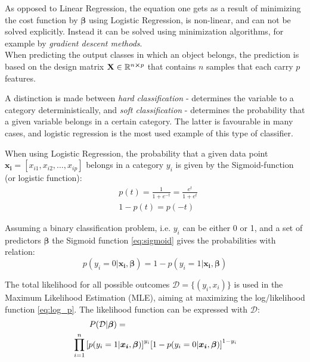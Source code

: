 As opposed to Linear Regression, the equation one gets as a result of minimizing the cost function by $\boldsymbol{\beta}$ using Logistic Regression, is non-linear, and can not be solved explicitly. Instead it can be solved using minimization algorithms, for example by \emph{gradient descent methods}. \\

When predicting the output classes in which an object belongs, the prediction is based on the design matrix $\mathbf{{X}} \in \mathbb{R}^{n\cross p}$ that contains $n$ samples that each carry $p$ features.

A distinction is made between \textit{hard classification} -  determines the variable to a category deterministically, and \textit{soft classification} - determines the probability that a given variable belongs in a certain category. The latter is favourable in many cases, and logistic regression is the most used example of this type of classifier.

When using Logistic Regression, the probability that a given data point $\boldsymbol{x_i}=[x_{i1},x_{i2},\ldots,x_{ip}]$ belongs in a category $y_i$ is given by the Sigmoid-function (or logistic function):
\begin{equation}
\begin{split}
    & p(t) = \frac{1}{1 + e^{-t}} = \frac{e^t}{1+e^t} \\
    & 1-p(t) = p(-t)
\end{split}
  \label{eq:sigmoid}
\end{equation}

Assuming a binary classification problem, i.e. $y_i$ can be either 0 or 1, and a set of predictors $\boldsymbol{\beta}$ the Sigmoid function \eqref{eq:sigmoid} gives the probabilities with relation:
\begin{equation*}
  p(y_i = 0|\boldsymbol{x_i},\boldsymbol{\beta})  = 1 - p(y_i = 1|\boldsymbol{x_i},\boldsymbol{\beta})
  \label{eq:prob_relation}
\end{equation*}

The total likelihood for all possible outcomes $\mathcal{D}=\{(y_i,x_i)\}$ is used in the Maximum Likelihood Estimation (MLE), aiming at maximizing the log/likelihood function \eqref{eq:log_p}. The likelihood function can be expressed with $\mathcal{D}$:
\begin{equation*}
\begin{split}
    &\qquad P(\mathcal{D}|\boldsymbol{\beta}) = \\
    &\prod_{i=1}^n \qty[p(y_i = 1|\boldsymbol{x_i},\boldsymbol{\beta}) ]^{y_i}  \qty[1 - p(y_i = 0|\boldsymbol{x_i},\boldsymbol{\beta})]^{1-y_i}
\end{split}
\end{equation*}

